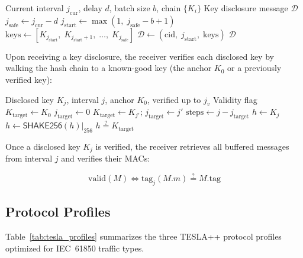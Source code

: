 \documentclass[conference,10pt]{IEEEtran}
\newcommand{\SHAKE}{\textsf{SHAKE256}}
\begin{document}
\begin{algorithm}[t]
\caption{TESLA++ Key Disclosure (Sender)}
\label{alg:disclose}
\begin{algorithmic}[1]
\REQUIRE Current interval $j_{\text{cur}}$, delay $d$, batch size $b$, chain $\{K_i\}$
\ENSURE Key disclosure message $\mathcal{D}$
\STATE $j_{\text{safe}} \gets j_{\text{cur}} - d$ 
\STATE $j_{\text{start}} \gets \max(1,\; j_{\text{safe}} - b + 1)$
\STATE $\text{keys} \gets [K_{j_{\text{start}}},\; K_{j_{\text{start}}+1},\; \ldots,\; K_{j_{\text{safe}}}]$
\STATE $\mathcal{D} \gets (\text{cid},\; j_{\text{start}},\; \text{keys})$
\RETURN $\mathcal{D}$
\end{algorithmic}
\end{algorithm}

Upon receiving a key disclosure, the receiver verifies each disclosed key by walking the hash chain to a known-good key (the anchor $K_0$ or a previously verified key):

\begin{algorithm}[t]
\caption{TESLA++ Key Verification (Receiver)}
\label{alg:verify_key}
\begin{algorithmic}[1]
\REQUIRE Disclosed key $K_j$, interval $j$, anchor $K_0$, verified up to $j_v$
\ENSURE Validity flag
\STATE $K_{\text{target}} \gets K_0$ 
\STATE $j_{\text{target}} \gets 0$
  \STATE $K_{\text{target}} \gets K_{j'}$; $j_{\text{target}} \gets j'$
\ENDIF
\STATE $\text{steps} \gets j - j_{\text{target}}$
\STATE $h \gets K_j$
  \STATE $h \gets \SHAKE{}(h)\big|_{256}$
\ENDFOR
\RETURN $h \stackrel{?}{=} K_{\text{target}}$
\end{algorithmic}
\end{algorithm}

Once a disclosed key $K_j$ is verified, the receiver retrieves all buffered messages from interval $j$ and verifies their MACs:

\begin{equation}
  \text{valid}(M) \iff \text{tag}_j(M.m) \stackrel{?}{=} M.\text{tag}
\end{equation}

\subsection{Protocol Profiles}

Table~\ref{tab:tesla_profiles} summarizes the three TESLA++ protocol profiles optimized for IEC~61850 traffic types.
\end{document}
